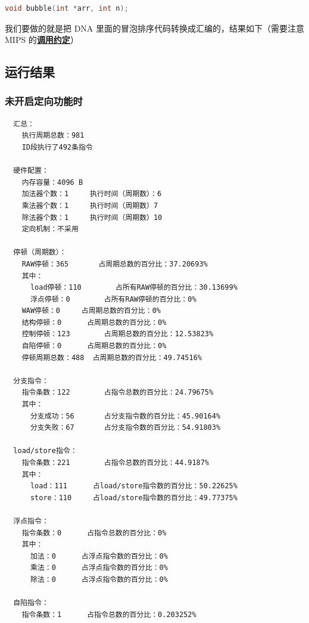 \documentclass[blue,normal,cn]{elegantnote}
\begin{document}
\begin{lstlisting}[language=C]
void bubble(int *arr, int n);
\end{lstlisting}

我们要做的就是把 DNA 里面的冒泡排序代码转换成汇编的，结果如下（需要注意 MIPS 的\href{https://courses.cs.washington.edu/courses/cse410/09sp/examples/MIPSCallingConventionsSummary.pdf}{\textbf{调用约定}}）



\subsection{运行结果}

\subsubsection{未开启定向功能时}

\begin{lstlisting}
  汇总：
    执行周期总数：981
    ID段执行了492条指令

  硬件配置：
    内存容量：4096 B
    加法器个数：1		执行时间（周期数）：6
    乘法器个数：1		执行时间（周期数）7		
    除法器个数：1		执行时间（周期数）10		
    定向机制：不采用

  停顿（周期数）：
    RAW停顿：365		占周期总数的百分比：37.20693%
    其中：
      load停顿：110		占所有RAW停顿的百分比：30.13699%
      浮点停顿：0		占所有RAW停顿的百分比：0%
    WAW停顿：0		占周期总数的百分比：0%
    结构停顿：0		占周期总数的百分比：0%
    控制停顿：123		占周期总数的百分比：12.53823%
    自陷停顿：0		占周期总数的百分比：0%
    停顿周期总数：488	占周期总数的百分比：49.74516%

  分支指令：
    指令条数：122		占指令总数的百分比：24.79675%
    其中：
      分支成功：56		占分支指令数的百分比：45.90164%
      分支失败：67		占分支指令数的百分比：54.91803%

  load/store指令：
    指令条数：221		占指令总数的百分比：44.9187%
    其中：
      load：111		占load/store指令数的百分比：50.22625%
      store：110		占load/store指令数的百分比：49.77375%

  浮点指令：
    指令条数：0		占指令总数的百分比：0%
    其中：
      加法：0		占浮点指令数的百分比：0%
      乘法：0		占浮点指令数的百分比：0%
      除法：0		占浮点指令数的百分比：0%

  自陷指令：
    指令条数：1		占指令总数的百分比：0.203252%
\end{lstlisting}
\end{document}
